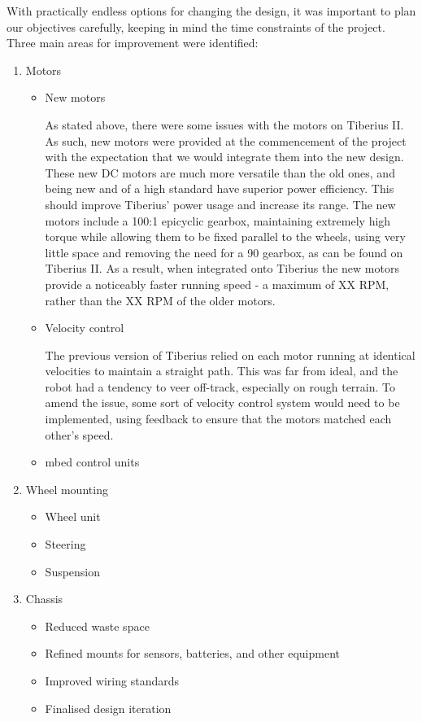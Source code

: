 With practically endless options for changing the design, it was important to plan our objectives carefully, keeping in mind the time constraints of the project. Three main areas for improvement were identified:

\begin{enumerate}
	\item Motors
	\begin{itemize}
    	\item New motors
    
    	As stated above, there were some issues with the motors on Tiberius II. As such, new motors were provided at the commencement of the project with the expectation that we would integrate them into the new design. These new DC motors are much more versatile than the old ones, and being new and of a high standard have superior power efficiency. This should improve Tiberius' power usage and increase its range.
        \newline
        The new motors include a 100:1 \gls{epicyclic gearbox}, maintaining extremely high torque while allowing them to be fixed parallel to the wheels, using very little space and removing the need for a 90\degree{} gearbox, as can be found on Tiberius II.
        \newline
        As a result, when integrated onto Tiberius the new motors provide a noticeably faster running speed - a maximum of XX \gls{RPM}, rather than the XX \gls{RPM} of the older motors.

    	\item Velocity control
        
        The previous version of Tiberius relied on each motor running at identical velocities to maintain a straight path. This was far from ideal, and the robot had a tendency to veer off-track, especially on rough terrain. To amend the issue, some sort of velocity control system would need to be implemented, using feedback to ensure that the motors matched each other's speed.
        
       	\item mbed control units
        
        
   	\end{itemize}
    
   	\item Wheel mounting
   	\begin{itemize}
     	\item Wheel unit
        \item Steering
        \item Suspension
   	\end{itemize}
    
	\item Chassis
   	\begin{itemize}
     	\item Reduced waste space
     	\item Refined mounts for sensors, batteries, and other equipment
     	\item Improved wiring standards
     	\item Finalised design iteration
   \end{itemize}
\end{enumerate}